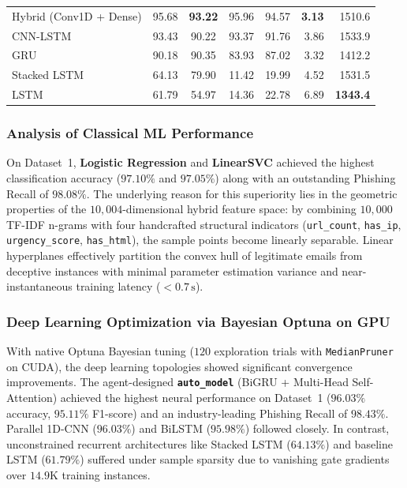 \documentclass[conference]{IEEEtran}
\begin{document}
\begin{table}[!t]
\begin{tabularx}{\textwidth}{@{}l c c c c r r@{}}
Hybrid (Conv1D + Dense)             & 95.68          & \textbf{93.22} & 95.96          & 94.57          & \textbf{3.13}  & 1510.6  \\
CNN-LSTM                            & 93.43          & 90.22          & 93.37          & 91.76          & 3.86           & 1533.9  \\
GRU                                 & 90.18          & 90.35          & 83.93          & 87.02          & 3.32           & 1412.2  \\
Stacked LSTM                        & 64.13          & 79.90          & 11.42          & 19.99          & 4.52           & 1531.5  \\
LSTM                                & 61.79          & 54.97          & 14.36          & 22.78          & 6.89           & \textbf{1343.4}  \\
\bottomrule
\end{tabularx}
\end{table}

\subsubsection{Analysis of Classical ML Performance}
On Dataset~1, \textbf{Logistic Regression} and \textbf{LinearSVC} achieved the highest classification accuracy ($97.10\%$ and $97.05\%$) along with an outstanding Phishing Recall of $98.08\%$. The underlying reason for this superiority lies in the geometric properties of the $10,004$-dimensional hybrid feature space: by combining $10,000$ TF-IDF n-grams with four handcrafted structural indicators (\texttt{url\_count}, \texttt{has\_ip}, \texttt{urgency\_score}, \texttt{has\_html}), the sample points become linearly separable. Linear hyperplanes effectively partition the convex hull of legitimate emails from deceptive instances with minimal parameter estimation variance and near-instantaneous training latency ($<0.7\,\text{s}$).

\subsubsection{Deep Learning Optimization via Bayesian Optuna on GPU}
With native Optuna Bayesian tuning ($120$ exploration trials with \texttt{MedianPruner} on CUDA), the deep learning topologies showed significant convergence improvements. The agent-designed \textbf{\texttt{auto\_model}} (BiGRU + Multi-Head Self-Attention) achieved the highest neural performance on Dataset~1 ($96.03\%$ accuracy, $95.11\%$ F1-score) and an industry-leading Phishing Recall of \textbf{$98.43\%$}. Parallel 1D-CNN ($96.03\%$) and BiLSTM ($95.98\%$) followed closely. In contrast, unconstrained recurrent architectures like Stacked LSTM ($64.13\%$) and baseline LSTM ($61.79\%$) suffered under sample sparsity due to vanishing gate gradients over $14.9\text{K}$ training instances.
\end{document}
